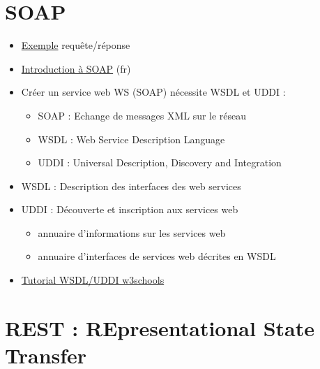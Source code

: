 \hypertarget{soap-2}{%
\section{SOAP}\label{soap-2}}

\begin{itemize}
\tightlist
\item
  \href{http://www.w3schools.com/xml/xml_soap.asp}{Exemple}
  requête/réponse
\item
  \href{http://www.soapuser.com/fr/basics1.html}{Introduction à SOAP}
  (fr)
\item
  Créer un service web WS (SOAP) nécessite WSDL et UDDI :

  \begin{itemize}
  \tightlist
  \item
    SOAP : Echange de messages XML sur le réseau
  \item
    WSDL : Web Service Description Language
  \item
    UDDI : Universal Description, Discovery and Integration
  \end{itemize}
\item
  WSDL : Description des interfaces des web services
\item
  UDDI : Découverte et inscription aux services web

  \begin{itemize}
  \tightlist
  \item
    annuaire d'informations sur les services web
  \item
    annuaire d'interfaces de services web décrites en WSDL
  \end{itemize}
\item
  \href{http://www.w3schools.com/xml/xml_wsdl.asp}{Tutorial WSDL/UDDI
  w3schools}
\end{itemize}

\hypertarget{rest-representational-state-transfer}{%
\section{REST : REpresentational State
Transfer}\label{rest-representational-state-transfer}}

